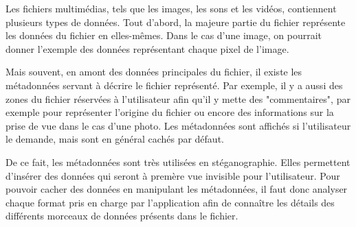 \documentclass[11pt]{article}
\begin{document}
Les fichiers multimédias, tels que les images, les sons et les vidéos,
contiennent plusieurs types de données. Tout d'abord, la majeure partie du
fichier représente les données du fichier en elles-mêmes. Dans le cas d'une
image, on pourrait donner l'exemple des données représentant chaque pixel de
l'image. 

Mais souvent, en amont des données principales du fichier, il existe les
métadonnées servant à décrire le fichier représenté. Par exemple, il y a 
aussi des zones du fichier réservées à l'utilisateur afin qu'il y mette des 
 "commentaires", par exemple pour représenter l'origine du fichier ou 
encore des informations sur la prise de vue dans le cas d'une photo. 
Les métadonnées sont affichés si l'utilisateur le demande, mais sont en 
général cachés par défaut.

De ce fait, les métadonnées sont très utilisées en stéganographie. Elles
permettent d'insérer des données qui seront à premère vue invisible pour
l'utilisateur. Pour pouvoir cacher des données en manipulant les métadonnées,
il faut donc analyser chaque format pris en charge par l'application afin de
connaître les détails des différents morceaux de données présents dans le
fichier. 
\end{document}
